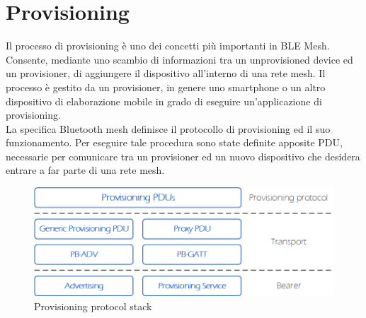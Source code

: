 \section{Provisioning}
\label{sec:provisioning}
Il processo di provisioning è uno dei concetti più importanti in BLE Mesh. Consente, mediante uno scambio di informazioni tra un unprovisioned device ed un provisioner, di aggiungere il dispositivo all'interno di una rete mesh. Il processo è gestito da un provisioner, in genere uno smartphone o un altro dispositivo di elaborazione mobile in grado di eseguire un'applicazione di provisioning.\\
La specifica Bluetooth mesh definisce il protocollo di provisioning ed il suo funzionamento. Per eseguire tale procedura sono state definite apposite PDU, necessarie per comunicare tra un provisioner ed un nuovo dispositivo che desidera entrare a far parte di una rete mesh.

\begin{figure}[!ht]
    \centering
    \includegraphics[width = \textwidth]{images/Provisioning_architecture.png}
    \caption{Provisioning protocol stack}
    \label{fig:provisioning_stack}
\end{figure}

